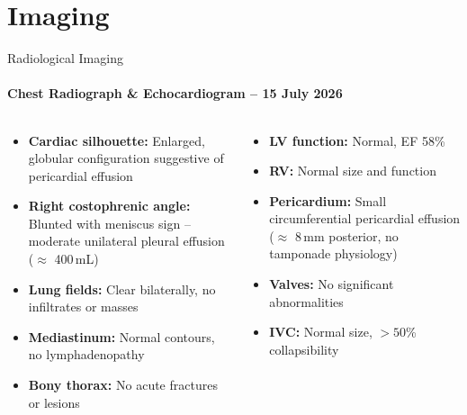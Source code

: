 \documentclass[10pt,aspectratio=169]{beamer}
\begin{document}
\section{Imaging}
\begin{frame}{Radiological Imaging}
  \framesubtitle{Chest Radiograph \& Echocardiogram -- 15 July 2026}

  \begin{columns}[T]
    \begin{tcolorbox}[infobox,title={\faSearch\hspace{4pt}Chest X-Ray (PA \& Lateral)}]
      \small
      \begin{itemize}
        \item \textbf{Cardiac silhouette:} Enlarged, globular configuration suggestive of pericardial effusion
        \item \textbf{Right costophrenic angle:} Blunted with meniscus sign -- moderate unilateral pleural effusion ($\approx$ 400\,mL)
        \item \textbf{Lung fields:} Clear bilaterally, no infiltrates or masses
        \item \textbf{Mediastinum:} Normal contours, no lymphadenopathy
        \item \textbf{Bony thorax:} No acute fractures or lesions
      \end{itemize}
    \end{tcolorbox}

    \begin{tcolorbox}[infobox,title={\faHeart\hspace{4pt}Transthoracic Echocardiogram}]
      \small
      \begin{itemize}
        \item \textbf{LV function:} Normal, EF 58\%
        \item \textbf{RV:} Normal size and function
        \item \textbf{Pericardium:} Small circumferential pericardial effusion ($\approx$ 8\,mm posterior, no tamponade physiology)
        \item \textbf{Valves:} No significant abnormalities
        \item \textbf{IVC:} Normal size, $>50$\% collapsibility
      \end{itemize}
    \end{tcolorbox}
  \end{columns}

  \vspace{0.4cm}


\end{frame}
\end{document}
